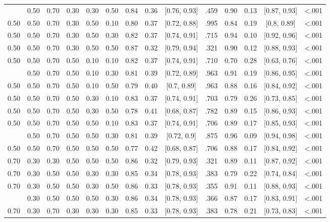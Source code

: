 \documentclass[
  11pt,
]{article}
\begin{document}
\begin{landscape}
\begin{ThreePartTable}
\begin{longtable}[t]{cccccccccccccc}
\addlinespace
0.50 & 0.50 & 0.70 & 0.30 & 0.30 & 0.50 & 0.84 & 0.36 & {}[0.76, 0.93] & .459 & 0.90 & 0.13 & {}[0.87, 0.93] & <.001\\
0.50 & 0.50 & 0.70 & 0.30 & 0.50 & 0.10 & 0.80 & 0.37 & {}[0.72, 0.88] & .995 & 0.84 & 0.19 & {}[0.8, 0.89] & <.001\\
0.50 & 0.50 & 0.70 & 0.30 & 0.50 & 0.30 & 0.82 & 0.37 & {}[0.74, 0.91] & .715 & 0.94 & 0.10 & {}[0.92, 0.96] & <.001\\
0.50 & 0.50 & 0.70 & 0.30 & 0.50 & 0.50 & 0.87 & 0.32 & {}[0.79, 0.94] & .321 & 0.90 & 0.12 & {}[0.88, 0.93] & <.001\\
0.50 & 0.50 & 0.70 & 0.50 & 0.10 & 0.10 & 0.82 & 0.37 & {}[0.74, 0.91] & .710 & 0.70 & 0.28 & {}[0.63, 0.76] & <.001\\
\addlinespace
0.50 & 0.50 & 0.70 & 0.50 & 0.10 & 0.30 & 0.81 & 0.39 & {}[0.72, 0.89] & .963 & 0.91 & 0.19 & {}[0.86, 0.95] & <.001\\
0.50 & 0.50 & 0.70 & 0.50 & 0.10 & 0.50 & 0.79 & 0.40 & {}[0.7, 0.89] & .963 & 0.88 & 0.16 & {}[0.84, 0.92] & <.001\\
0.50 & 0.50 & 0.70 & 0.50 & 0.30 & 0.10 & 0.83 & 0.37 & {}[0.74, 0.91] & .703 & 0.79 & 0.26 & {}[0.73, 0.85] & <.001\\
0.50 & 0.50 & 0.70 & 0.50 & 0.30 & 0.50 & 0.78 & 0.41 & {}[0.68, 0.87] & .782 & 0.89 & 0.15 & {}[0.86, 0.93] & <.001\\
0.50 & 0.50 & 0.70 & 0.50 & 0.50 & 0.10 & 0.83 & 0.37 & {}[0.74, 0.91] & .706 & 0.89 & 0.17 & {}[0.85, 0.93] & <.001\\
\addlinespace
0.50 & 0.50 & 0.70 & 0.50 & 0.50 & 0.30 & 0.81 & 0.39 & {}[0.72, 0.9] & .875 & 0.96 & 0.09 & {}[0.94, 0.98] & <.001\\
0.50 & 0.50 & 0.70 & 0.50 & 0.50 & 0.50 & 0.77 & 0.42 & {}[0.68, 0.87] & .706 & 0.88 & 0.17 & {}[0.84, 0.92] & <.001\\
0.70 & 0.30 & 0.30 & 0.50 & 0.50 & 0.50 & 0.86 & 0.32 & {}[0.79, 0.93] & .321 & 0.89 & 0.11 & {}[0.87, 0.92] & <.001\\
0.70 & 0.30 & 0.50 & 0.50 & 0.30 & 0.30 & 0.85 & 0.34 & {}[0.78, 0.93] & .383 & 0.79 & 0.22 & {}[0.74, 0.84] & <.001\\
0.70 & 0.30 & 0.50 & 0.50 & 0.30 & 0.50 & 0.86 & 0.33 & {}[0.78, 0.93] & .355 & 0.91 & 0.11 & {}[0.88, 0.93] & <.001\\
\addlinespace
0.70 & 0.30 & 0.50 & 0.50 & 0.50 & 0.30 & 0.86 & 0.34 & {}[0.78, 0.93] & .366 & 0.87 & 0.17 & {}[0.83, 0.91] & <.001\\
0.70 & 0.30 & 0.70 & 0.30 & 0.30 & 0.30 & 0.85 & 0.33 & {}[0.78, 0.93] & .383 & 0.78 & 0.21 & {}[0.73, 0.83] & <.001\\

\end{longtable}
\end{ThreePartTable}
\end{landscape}
\end{document}
